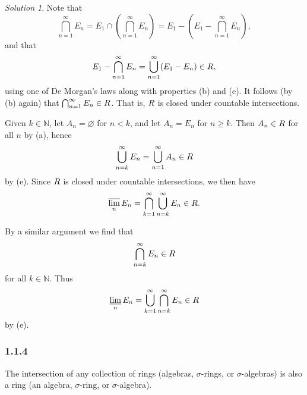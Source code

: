 \documentclass{report}
\newcommand{\bb}[1]{\mathbb{#1}}
\let\sc\relax
\newcommand{\sc}[1]{\mathscr{#1}}
\theoremstyle{remark}
\newtheorem*{solution}{Solution}
\begin{document}
\begin{solution}
  Note that
  \begin{equation*}
    \bigcap_{n=1}^\infty E_n = E_1 \cap \left( \bigcap_{n=1}^\infty E_n \right) = E_1 - \left( E_1 - \bigcap_{n=1}^\infty E_n \right),
  \end{equation*}
  and that
  \begin{equation*}
    E_1 - \bigcap_{n=1}^\infty E_n = \bigcup_{n=1}^\infty (E_1 - E_n) \in \sc R,
  \end{equation*}
  using one of De Morgan's laws along with properties (b) and (e). It follows (by (b) again) that $\bigcap_{n=1}^\infty E_n \in \sc R$. That is, $\sc R$ is closed under countable intersections.

  Given $k \in \bb N$, let $A_n = \varnothing$ for $n < k$, and let $A_n = E_n$ for $n \ge k$. Then $A_n \in \sc R$ for all $n$ by (a), hence
  \begin{equation*}
    \bigcup_{n=k}^\infty E_n = \bigcup_{n=1}^\infty A_n \in \sc R
  \end{equation*}
  by (e). Since $\sc R$ is closed under countable intersections, we then have
  \begin{equation*}
    \varlimsup_n E_n = \bigcap_{k=1}^\infty \bigcup_{n=k}^\infty E_n \in \sc R.
  \end{equation*}

  By a similar argument we find that
  \begin{equation*}
    \bigcap_{n=k}^\infty E_n \in \sc R
  \end{equation*}
  for all $k \in \bb N$. Thus
  \begin{equation*}
    \varliminf_n E_n = \bigcup_{k=1}^\infty \bigcap_{n=k}^\infty E_n \in \sc R
  \end{equation*}
  by (e).
\end{solution}

\subsubsection*{1.1.4}
The intersection of any collection of rings (algebras, $\sigma$-rings, or $\sigma$-algebras) is also a ring (an algebra, $\sigma$-ring, or $\sigma$-algebra).
\end{document}

